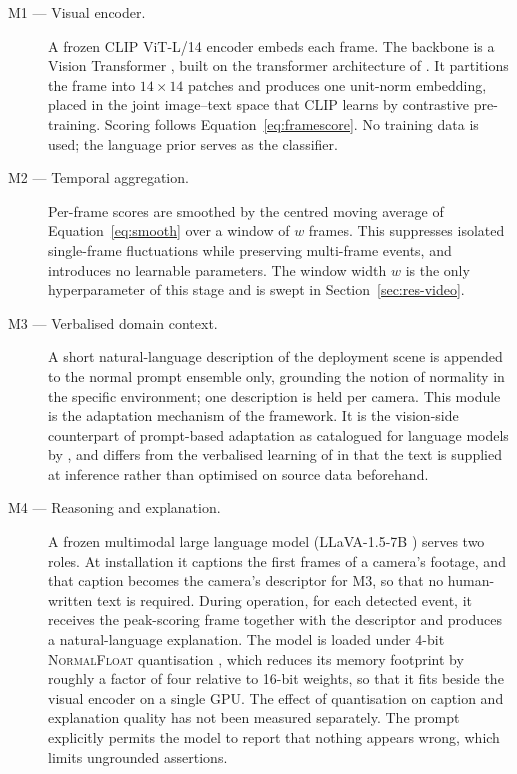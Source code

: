 \documentclass[a4paper,fleqn]{cas-sc}
\begin{document}
\begin{description}
  \item[M1 --- Visual encoder.] A frozen CLIP ViT-L/14 encoder
  \citep{radford2021clip} embeds each frame. The backbone is a Vision
  Transformer \citep{dosovitskiy2021vit}, built on the transformer architecture
  of \citet{vaswani2017attention}. It partitions the frame into
  $14 \times 14$ patches and produces one unit-norm embedding, placed in the
  joint image--text space that CLIP learns by contrastive pre-training. Scoring
  follows Equation~\eqref{eq:framescore}. No training data is used; the
  language prior serves as the classifier.

  \item[M2 --- Temporal aggregation.] Per-frame scores are smoothed by the
  centred moving average of Equation~\eqref{eq:smooth} over a window of $w$
  frames. This suppresses isolated single-frame fluctuations while preserving
  multi-frame events, and introduces no learnable parameters. The window width
  $w$ is the only hyperparameter of this stage and is swept in
  Section~\ref{sec:res-video}.

  \item[M3 --- Verbalised domain context.] A short natural-language description
  of the deployment scene is appended to the normal prompt ensemble only,
  grounding the notion of normality in the specific environment; one
  description is held per camera. This module is the adaptation
  mechanism of the framework. It is the vision-side counterpart of prompt-based
  adaptation as catalogued for language models by \citet{fan2026llm}, and
  differs from the verbalised learning of \citet{ye2025vera} in that the text is
  supplied at inference rather than optimised on source data beforehand.

  \item[M4 --- Reasoning and explanation.] A frozen multimodal large language
  model (LLaVA-1.5-7B \citep{liu2023llava}) serves two roles. At installation it
  captions the first frames of a camera's footage, and that caption becomes the
  camera's descriptor for M3, so that no human-written text is required. During
  operation, for each detected event, it receives the peak-scoring frame
  together with the descriptor and produces a natural-language explanation.
  The model is loaded under 4-bit
  \textsc{NormalFloat} quantisation \citep{dettmers2023qlora}, which reduces its
  memory footprint by roughly a factor of four relative to 16-bit weights, so
  that it fits beside the visual encoder on a single GPU. The effect of
  quantisation on caption and explanation quality has not been measured
  separately. The prompt explicitly permits the model to report that nothing
  appears wrong, which limits ungrounded assertions.
\end{description}
\end{document}
